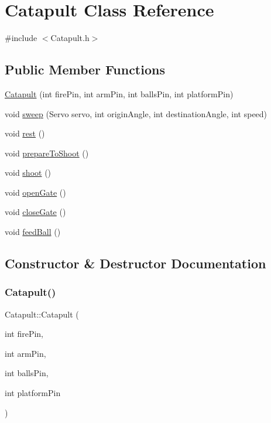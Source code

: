 \hypertarget{class_catapult}{}\section{Catapult Class Reference}
\label{class_catapult}


{\ttfamily \#include $<$Catapult.\+h$>$}

\subsection*{Public Member Functions}
\begin{DoxyCompactItemize}
\item 
\hyperlink{class_catapult_abac7199aa72bdd69ec98034f7c73fb07}{Catapult} (int fire\+Pin, int arm\+Pin, int balls\+Pin, int platform\+Pin)
\item 
void \hyperlink{class_catapult_ae6274ce7039929a6c9468aa9d5d763ef}{sweep} (Servo servo, int origin\+Angle, int destination\+Angle, int speed)
\item 
void \hyperlink{class_catapult_ae9673fabd4375317bebb257b64db4d84}{rest} ()
\item 
void \hyperlink{class_catapult_aad215c7a20a16a76a8cac9b9538a64ed}{prepare\+To\+Shoot} ()
\item 
void \hyperlink{class_catapult_a4a2ea0d327a135f6a5a2283436e1a99f}{shoot} ()
\item 
void \hyperlink{class_catapult_a67141918881d6bf8ddd171dc9eb8d87f}{open\+Gate} ()
\item 
void \hyperlink{class_catapult_a33ed3abd636cc9cdc267a9d06ef8d1db}{close\+Gate} ()
\item 
void \hyperlink{class_catapult_ab6f3cc1858e28ad31ecc4a26dfc0cd31}{feed\+Ball} ()
\end{DoxyCompactItemize}


\subsection{Constructor \& Destructor Documentation}
\mbox{\label{class_catapult_abac7199aa72bdd69ec98034f7c73fb07}} 
\subsubsection{\texorpdfstring{Catapult()}{Catapult()}}
{\footnotesize\ttfamily Catapult\+::\+Catapult (\begin{DoxyParamCaption}\item[{int}]{fire\+Pin,  }\item[{int}]{arm\+Pin,  }\item[{int}]{balls\+Pin,  }\item[{int}]{platform\+Pin }\end{DoxyParamCaption})}



